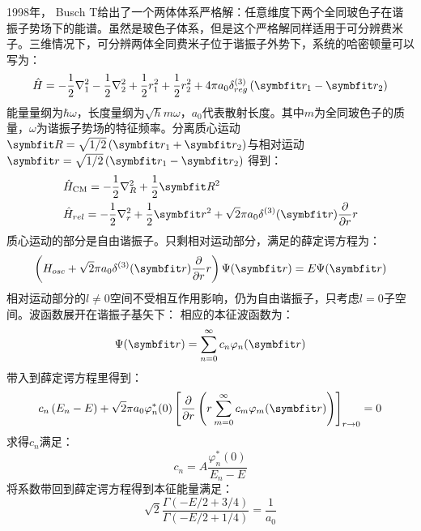 1998年， Busch T给出了一个两体体系严格解\cite{busch1998two}：任意维度下两个全同玻色子在谐振子势场下的能谱。虽然是玻色子体系，但是这个严格解同样适用于可分辨费米子。三维情况下，可分辨两体全同费米子位于谐振子外势下，系统的哈密顿量可以写为：
\begin{equation}
\hat{H}=-\frac{1}{2} \nabla_{1}^{2}-\frac{1}{2} \nabla_{2}^{2}+\frac{1}{2} r_{1}^{2}+\frac{1}{2} r_{2}^{2}+4 \pi a_{0} \delta_{r e g}^{(3)}\left(\Vector{r}_{1}-\Vector{r}_{2}\right)
\end{equation}
能量量纲为$\hbar\omega$，长度量纲为$\sqrt{\hbar}{m\omega}$，$a_0$代表散射长度。其中$m$为全同玻色子的质量，$\omega$为谐振子势场的特征频率。分离质心运动$\Vector{R}=\sqrt{1 / 2}\left(\Vector{r}_{1}+\Vector{r}_{2}\right)$与相对运动$\Vector{r}=\sqrt{1 / 2}\left(\Vector{r}_{1}-\Vector{r}_{2}\right)$
得到：
\begin{equation}
\begin{aligned}
&\hat{H}_{\mathrm{CM}}=-\frac{1}{2} \nabla_{R}^{2}+\frac{1}{2} \Vector{R}^{2}\\
&\hat{H}_{rel}=-\frac{1}{2} \nabla_{r}^{2}+\frac{1}{2} \Vector{r}^{2}+\sqrt{2} \pi a_{0} \delta^{(3)}(\Vector{r}) \frac{\partial}{\partial r} r\\
\end{aligned}
\end{equation}
质心运动的部分是自由谐振子。只剩相对运动部分，满足的薛定谔方程为：
\begin{equation}
\left(H_{o s c}+\sqrt{2} \pi a_{0} \delta^{(3)}(\Vector{r}) \frac{\partial}{\partial r} r\right) \Psi(\Vector{r})=E \Psi(\Vector{r})
\end{equation}
相对运动部分的$l\neq0$空间不受相互作用影响，仍为自由谐振子，只考虑$l=0$子空间。波函数展开在谐振子基矢下：
相应的本征波函数为：
\begin{equation}
\Psi(\Vector{r})=\sum_{n=0}^{\infty} c_{n} \varphi_{n}(\Vector{r})
\end{equation}
带入到薛定谔方程里得到：
\begin{equation}
c_{n}\left(E_{n}-E\right)+\sqrt{2} \pi a_{0} \varphi_{n}^{*}(0)\left[\frac{\partial}{\partial r}\left(r \sum_{m=0}^{\infty} c_{m} \varphi_{m}(\Vector{r})\right)\right]_{r \rightarrow 0}=0
\end{equation}
求得$c_n$满足：
\begin{equation}
c_{n}=A \frac{\varphi_{n}^{*}(0)}{E_{n}-E}
\end{equation}
将系数带回到薛定谔方程得到本征能量满足：
\begin{equation}
\sqrt{2} \frac{\Gamma(-E / 2+3 / 4)}{\Gamma(-E / 2+1 / 4)}=\frac{1}{a_{0}}
\end{equation}
